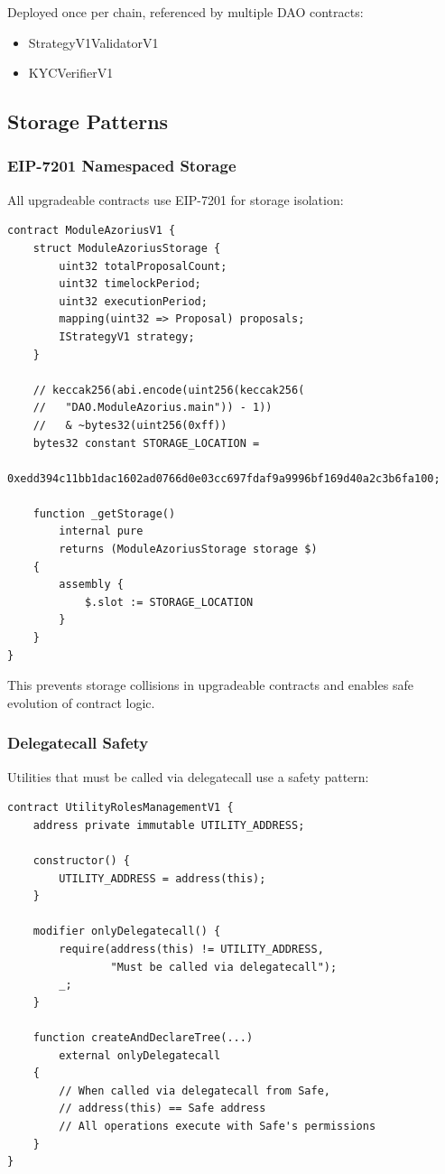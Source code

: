 Deployed once per chain, referenced by multiple DAO contracts:
\begin{itemize}
    \item StrategyV1ValidatorV1
    \item KYCVerifierV1
\end{itemize}

\subsection{Storage Patterns}

\subsubsection{EIP-7201 Namespaced Storage}

All upgradeable contracts use EIP-7201 \cite{eip7201} for storage isolation:

\begin{lstlisting}[caption=Namespaced Storage Pattern]
contract ModuleAzoriusV1 {
    struct ModuleAzoriusStorage {
        uint32 totalProposalCount;
        uint32 timelockPeriod;
        uint32 executionPeriod;
        mapping(uint32 => Proposal) proposals;
        IStrategyV1 strategy;
    }

    // keccak256(abi.encode(uint256(keccak256(
    //   "DAO.ModuleAzorius.main")) - 1))
    //   & ~bytes32(uint256(0xff))
    bytes32 constant STORAGE_LOCATION =
        0xedd394c11bb1dac1602ad0766d0e03cc697fdaf9a9996bf169d40a2c3b6fa100;

    function _getStorage()
        internal pure
        returns (ModuleAzoriusStorage storage $)
    {
        assembly {
            $.slot := STORAGE_LOCATION
        }
    }
}
\end{lstlisting}

This prevents storage collisions in upgradeable contracts and enables safe evolution of contract logic.

\subsubsection{Delegatecall Safety}

Utilities that must be called via delegatecall use a safety pattern:

\begin{lstlisting}[caption=Delegatecall Detection]
contract UtilityRolesManagementV1 {
    address private immutable UTILITY_ADDRESS;

    constructor() {
        UTILITY_ADDRESS = address(this);
    }

    modifier onlyDelegatecall() {
        require(address(this) != UTILITY_ADDRESS,
                "Must be called via delegatecall");
        _;
    }

    function createAndDeclareTree(...)
        external onlyDelegatecall
    {
        // When called via delegatecall from Safe,
        // address(this) == Safe address
        // All operations execute with Safe's permissions
    }
}
\end{lstlisting}

